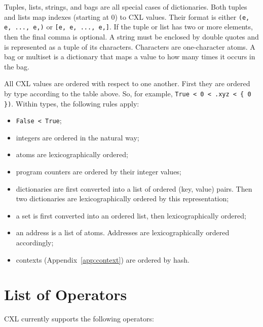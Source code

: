 \documentclass{report}
\begin{document}
Tuples, lists, strings, and bags are all special cases of dictionaries.
Both tuples and lists map indexes (starting at 0) to CXL values.
Their format is either \texttt{(e, e, ..., e,)} or
\texttt{[e, e, ..., e,]}.
If the tuple or list has two or more elements, then the final comma
is optional.
A string must be enclosed by double quotes and is represented as
a tuple of its characters.  Characters are one-character atoms.
A bag or multiset is a dictionary that maps a value to how many
times it occurs in the bag.

All CXL values are ordered with respect to one another.  First they
are ordered by type according to the table above.
So, for example, \texttt{\texttt{True} < 0 < .xyz < \{ 0 \})}.
Within types, the following rules apply:

\begin{itemize}
\item \texttt{False < True};
\item integers are ordered in the natural way;
\item atoms are lexicographically ordered;
\item program counters are ordered by their integer values;
\item dictionaries are first converted into a list of ordered (key, value)
pairs.  Then two dictionaries are lexicographically ordered by this
representation;
\item a set is first converted into an ordered list, then lexicographically
ordered;
\item an address is a list of atoms.  Addresses are lexicographically
ordered accordingly;
\item contexts (Appendix~\ref{app:context}) are ordered by hash.
\end{itemize}

\chapter{List of Operators}

CXL currently supports the following operators:
\end{document}
